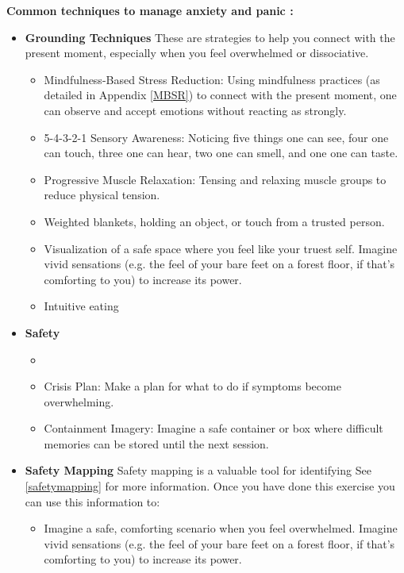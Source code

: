\documentclass[12pt,letterpaper]{article}
\begin{document}
\noindent \textbf{Common techniques to manage anxiety and panic \cite{vanderKolkBody,williamsWorkbook}:}
\begin{itemize}
    \item \textbf{Grounding Techniques} These are strategies to help you connect with the present moment, especially when you feel overwhelmed or dissociative.
    \begin{itemize}
        \item Mindfulness-Based Stress Reduction: Using mindfulness practices (as detailed in Appendix \ref{MBSR}) to connect with the present moment, one can observe and accept emotions without reacting as strongly.
        \item 5-4-3-2-1 Sensory Awareness: Noticing five things one can see, four one can touch, three one can hear, two one can smell, and one one can taste.
        \item Progressive Muscle Relaxation: Tensing and relaxing muscle groups to reduce physical tension.
        \item Weighted blankets, holding an object, or touch from a trusted person.
        \item Visualization of a safe space where you feel like your truest self. Imagine vivid sensations (e.g. the feel of your bare feet on a forest floor, if that's comforting to you) to increase its power.
        \item Intuitive eating
    \end{itemize}
    \item \textbf{Safety}
    \begin{itemize}
        \item {}
        \item Crisis Plan: Make a plan for what to do if symptoms become overwhelming. 
        \item Containment Imagery: Imagine a safe container or box where difficult memories can be stored until the next session.
    \end{itemize}
    \item \textbf{Safety Mapping} Safety mapping is a valuable tool for identifying See \ref{safetymapping} for more information. Once you have done this exercise you can use this information to:
    \begin{itemize}
        \item Imagine a safe, comforting scenario when you feel overwhelmed. Imagine vivid sensations (e.g. the feel of your bare feet on a forest floor, if that's comforting to you) to increase its power.

\end{itemize}
\end{itemize}
\end{document}
